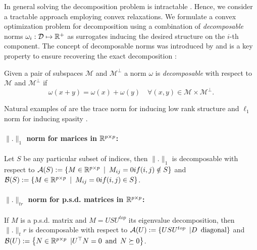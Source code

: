 \documentclass{article}
\begin{document}
In general solving the decomposition problem is intractable . Hence, we consider a tractable approach employing convex relaxations. We formulate a convex optimization problem for decomposition using a combination of \emph{decomposable} norms $\omega_{i}:\mathcal{D}\mapsto \mathbb{R}^{+}$ as surrogates inducing the desired structure on the $i$-th component. The concept of decomposable norms was introduced by \citet{negahban2009unified} and is a key property to ensure recovering the exact decomposition :

\begin{mydef}
Given a pair of subspaces $\mathcal{M}$ and $\mathcal{M}^{\perp}$ a norm $\omega$ is
\emph{decomposable} with respect to $\mathcal{M}$ and $\mathcal{M}^{\perp}$ if
$$
\omega(x+y)=\omega(x)+\omega(y) \quad \forall (x,y)\in\mathcal{M}\times\mathcal{M}^{\perp}.
$$
\end{mydef}

Natural examples of are the trace norm for inducing low rank structure and $\ell_1$ norm for inducing spasity .\\

\paragraph{$\|.\|_1$ norm for marices in $\mathbb{R}^{p\times p}$: } Let $S$ be any particular subset of indices, then $\|.\|_1$ is decomposable with respect to $\mathcal{A}(S):=\left\lbrace M\in\mathbb{R}^{p\times p} \enskip | \enskip M_{ij}=0 if (i,j) \notin S\right\rbrace$ and $\mathcal{B}(S):=\left\lbrace M\in\mathbb{R}^{p\times p} \enskip | \enskip M_{ij}=0 if (i,j) \in S\right\rbrace$.

\paragraph{$\|.\|_{tr}$ norm for p.s.d. matrices in $\mathbb{R}^{p\times p}$: } If $M$ is a p.s.d. matrix and $M=USU^{top}$ its eigenvalue decomposition, then $\|.\|_tr$ is decomposable with respect to $\mathcal{A}(U):=\left\lbrace USU^{top} \enskip | D \enskip \text{diagonal}\right\rbrace$ and $\mathcal{B}(U):=\left\lbrace N\in\mathbb{R}^{p\times p} \enskip | U^{\top}N=0 \enskip \text{and} \enskip N \succeq 0\right\rbrace$.\\
\end{document}
